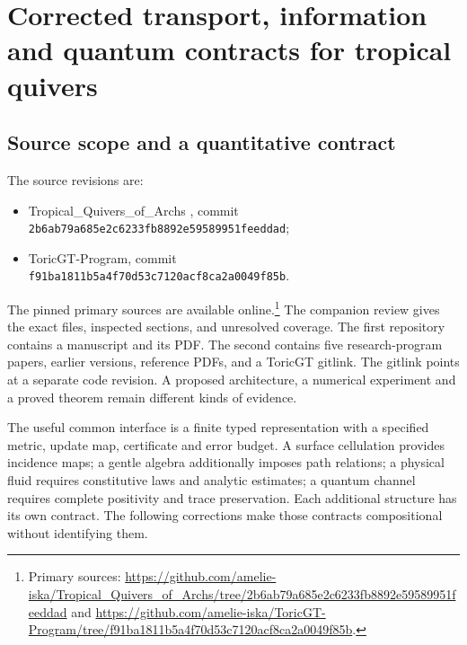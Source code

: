 \chapter{Corrected transport, information and quantum contracts for tropical quivers}
\label{ch:toric-transport-audit}

\section{Source scope and a quantitative contract}

The source revisions are:
\begin{itemize}
\item Tropical\_Quivers\_of\_Archs \cite{ToricAuditQuivers2026}, commit\\
\texttt{2b6ab79a685e2c6233fb8892e59589951feeddad};
\item ToricGT-Program, commit\\
\texttt{f91ba1811b5a4f70d53c7120acf8ca2a0049f85b}.
\end{itemize}
The pinned primary sources are available online.\footnote{Primary sources:
\url{https://github.com/amelie-iska/Tropical_Quivers_of_Archs/tree/2b6ab79a685e2c6233fb8892e59589951feeddad}
and \url{https://github.com/amelie-iska/ToricGT-Program/tree/f91ba1811b5a4f70d53c7120acf8ca2a0049f85b}.}
The companion review gives
the exact files, inspected sections, and unresolved coverage. The first
repository contains a manuscript and its PDF. The second contains five
research-program papers, earlier versions, reference PDFs, and a ToricGT
gitlink. The gitlink points at a separate code revision. A proposed
architecture, a numerical experiment and a proved theorem remain different
kinds of evidence.

The useful common interface is a finite typed representation with a
specified metric, update map, certificate and error budget. A surface
cellulation provides incidence maps; a gentle algebra additionally imposes
path relations; a physical fluid requires constitutive laws and analytic
estimates; a quantum channel requires complete positivity and trace
preservation. Each additional structure has its own contract. The following
corrections make those contracts compositional without identifying them.

